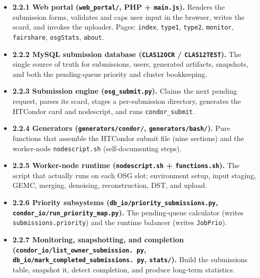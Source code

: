 \begin{itemize}
  \item \textbf{2.2.1 Web portal (\texttt{web\_\allowbreak{}portal/\allowbreak{}}, PHP +
  \texttt{main.\allowbreak{}js}).} Renders the submission forms, validates and caps user input in the browser,
  writes the scard, and invokes the uploader. Pages: \texttt{index}, \texttt{type1}, \texttt{type2},
  \texttt{monitor}, \texttt{fairshare}, \texttt{osgStats}, \texttt{about}.
  \item \textbf{2.2.2 MySQL submission database (\texttt{CLAS12OCR} / \texttt{CLAS12TEST}).} The single source
  of truth for submissions, users, generated artifacts, snapshots, and both the pending-queue priority and
  cluster bookkeeping.
  \item \textbf{2.2.3 Submission engine (\texttt{osg\_\allowbreak{}submit.\allowbreak{}py}).} Claims the next
  pending request, parses its scard, stages a per-submission directory, generates the HTCondor card and
  nodescript, and runs \texttt{condor\_\allowbreak{}submit}.
  \item \textbf{2.2.4 Generators (\texttt{generators/\allowbreak{}condor/\allowbreak{}},
  \texttt{generators/\allowbreak{}bash/\allowbreak{}}).} Pure functions that assemble the HTCondor submit file
  (nine sections) and the worker-node \texttt{nodescript.\allowbreak{}sh} (self-documenting steps).
  \item \textbf{2.2.5 Worker-node runtime (\texttt{nodescript.\allowbreak{}sh} +
  \texttt{functions.\allowbreak{}sh}).} The script that actually runs on each OSG slot: environment setup,
  input staging, GEMC, merging, denoising, reconstruction, DST, and upload.
  \item \textbf{2.2.6 Priority subsystems
  (\texttt{db\_\allowbreak{}io/\allowbreak{}priority\_\allowbreak{}submissions.\allowbreak{}py},
  \texttt{condor\_\allowbreak{}io/\allowbreak{}run\_\allowbreak{}priority\_\allowbreak{}map.\allowbreak{}py}).}
  The pending-queue calculator (writes \texttt{submissions.\allowbreak{}priority}) and the runtime balancer
  (writes \texttt{JobPrio}).
  \item \textbf{2.2.7 Monitoring, snapshotting, and completion
  (\texttt{condor\_\allowbreak{}io/\allowbreak{}list\_\allowbreak{}owner\_\allowbreak{}submission.%
\allowbreak{}py},
  \texttt{db\_\allowbreak{}io/\allowbreak{}mark\_\allowbreak{}completed\_\allowbreak{}submissions.%
\allowbreak{}py}, \texttt{stats/\allowbreak{}}).} Build the submissions table, snapshot it, detect completion,
  and produce long-term statistics.
\end{itemize}

